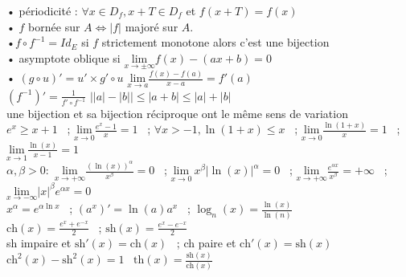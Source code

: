 \documentclass[12 pt]{book}
\begin{document}
\begin{flushleft}
\begin{doublespace}
	• périodicité : $\forall x \in D_f, x+T \in D_f$ et $ f(x+T)=f(x)$ \\
	• $f$ bornée sur $A \Leftrightarrow |f|$ majoré sur $A$.\\
	•$f\circ f^{-1}=Id_E$ si $f$ strictement monotone alors c'est une bijection \\
	• asymptote oblique si $\underset{x \rightarrow \pm \infty}{\text{lim}} f(x)-(ax+b)=0$ \\
	• $(g\circ u)'=u' \times g'\circ u$ \quad $\underset{x \rightarrow a}{\text{lim}} \frac{f(x)-f(a)}{x-a} = f'(a)$ \\
	$(f^{-1})'=\frac{1}{f'\circ f^{-1}}$ \quad $\Big| |a|-|b| \Big| \leq |a+b| \leq |a|+|b|$ \\
	une bijection et sa bijection réciproque ont le même sens de variation \\
	$e^x \geq x+1$ \ ;  $\underset{x \rightarrow 0}{\text{lim}} \frac{e^x -1}{x} = 1$ \ ;  $\forall x> -1, \ln(1+x) \leq x$ \ ;  $\underset{x \rightarrow 0}{\text{lim}} \frac{\ln(1+x)}{x} = 1$ \ ;  $\underset{x \rightarrow 1}{\text{lim}} \frac{\ln(x)}{x-1} = 1$ \\
	$\alpha , \beta > 0 :$ $\underset{x \rightarrow + \infty}{\text{lim}} \frac{(\ln(x))^\alpha}{x^\beta} = 0$ \ ;  $\underset{x \rightarrow 0}{\text{lim}}\ x^\beta \big| \ln(x) \big|^\alpha = 0 $ \ ; $\underset{x \rightarrow + \infty}{\text{lim}} \frac{e^{\alpha x}}{x^\beta} = + \infty$ \ ; $\underset{x \rightarrow - \infty}{\text{lim}} |x|^\beta e^{\alpha x} = 0$ \\
	$x^\alpha = e^{\alpha \ln x}$ \ ; $(a^x)' = \ln(a) a^x$ \ ; $\log_n(x) = \frac{\ln(x)}{\ln(n)}$ \\
	$\text{ch}(x) = \frac{e^x + e^{-x}}{2}$ \ ; $\text{sh}(x) = \frac{e^x - e^{-x}}{2}$ \\
	sh impaire et $\text{sh}'(x)=\text{ch}(x)$ \ ; ch paire et $\text{ch}'(x)=\text{sh}(x)$ \ $\text{ch}^2(x) - \text{sh}^2(x) = 1$ \ $\text{th}(x) = \frac{\text{sh}(x)}{\text{ch}(x)}$ \\ 
	

\end{doublespace}
\end{flushleft}
\end{document}
